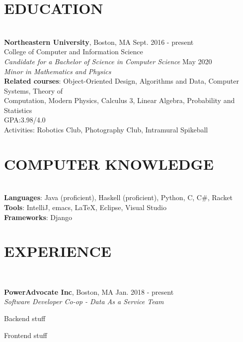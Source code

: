 \documentclass[11pt]{res}
\newcommand{\sectionunderline}{\vspace{-3mm}\hrulefill\\}
\newcommand{\listingtab}{\tabto{3.5cm}}
\newcommand{\newsect}[1]{\section{\Large \bf #1}}
\newcommand{\email}[1]{\faEnvelope\hspace{1mm} \href{mailto:#1}{#1}}
\newcommand{\phone}[1]{\faMobilePhone\hspace{1mm} #1}
\newcommand{\github}[1]{\faGithubSquare\hspace{1mm} \href{https://github.com/#1}{#1}}
\newcommand{\linkedin}[1]{\faLinkedinSquare\hspace{1mm} \href{https://linkedin.com/in/#1}{#1}}
\begin{document}
\address{
  {\color{darkgray}\footnotesize School address: 40A Leon Street \#7754, Boston, MA 02115}\\
  \footnotesize\phone{(802) 503-5089}
  \large{$\bullet$}
  \footnotesize\email{derekpham67@gmail.com}
  \large{$\bullet$}
  \footnotesize\github{derekpham}
  \large{$\bullet$}
  \footnotesize\linkedin{derek-pham97}\\
  \small Available: January - August 2019
}

\begin{resume}
  \newsect{EDUCATION}{
    \sectionunderline{
      {\bf \large Northeastern University}, Boston, MA \hfill Sept. 2016 - present\\
      College of Computer and Information Science}\\
                     {\it Candidate for a Bachelor of Science in Computer Science} \hfill May 2020\\
                     {\it Minor in Mathematics and Physics}\\
                     {\bf Related courses}:\listingtab
                     Object-Oriented Design, Algorithms and Data, Computer Systems, Theory of\\
                     \listingtab Computation, Modern Physics, Calculus 3, Linear Algebra, Probability and Statistics\\
                     GPA:\listingtab 3.98/4.0\\
                     Activities: \listingtab Robotics Club, Photography Club, Intramural Spikeball
  }

  \newsect{COMPUTER KNOWLEDGE}{
    \sectionunderline{
      {\bf Languages}: \listingtab Java (proficient), Haskell (proficient), Python, C, C\#, Racket\\
      {\bf Tools}: \listingtab IntelliJ, emacs, \LaTeX, Eclipse, Visual Studio\\
      {\bf Frameworks}: \listingtab Django
    }
  }

  \newsect{EXPERIENCE}{
    \sectionunderline{
      {\bf PowerAdvocate Inc}, Boston, MA \hfill Jan. 2018 - present\\
      {\it Software Developer Co-op - Data As a Service Team}
      \begin{itemize}
        {\item Backend stuff}
        {\item Frontend stuff}
      \end{itemize}

}}
\end{resume}
\end{document}
